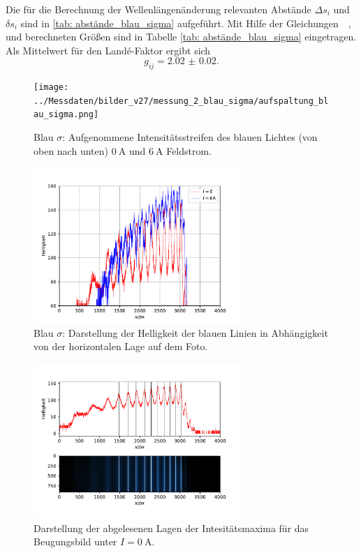 Die für die Berechnung der Wellenlängenänderung relevanten Abstände $\Delta s_i$ und $\delta s_i$
sind in \autoref{tab: abstände_blau_sigma}
aufgeführt. Mit Hilfe der Gleichungen~~\label{eq: wellen_änderung}, \label{eq:energie_diff} und \label{eq: uebergangs_lande}
berechneten Größen sind in Tabelle
\ref{tab: abstände_blau_sigma} eingetragen. Als Mittelwert für den Landé-Faktor ergibt sich
\begin{equation}
  g_{ij} = \num{2.02(2)}.
\end{equation}
\begin{figure}
  \centering
  \texttt{[image: ../Messdaten/bilder\_v27/messung\_2\_blau\_sigma/aufspaltung\_blau\_sigma.png]}
  \caption{Blau $\sigma$: Aufgenommene Intensitätsstreifen des blauen Lichtes (von oben nach unten) $\SI{0}{\ampere}$ und $\SI{6}{\ampere}$ Feldstrom.}
  \label{fig: aufspaltung_blau_sigma}
\end{figure}
\begin{figure}
  \centering
  \includegraphics[width = 0.7\textwidth]{../Messdaten/plots/blau_sigma_intensitaet.pdf}
  \caption{Blau $\sigma$: Darstellung der Helligkeit der blauen Linien in Abhängigkeit von der horizontalen Lage auf dem Foto.}
  \label{fig: blau_intensität_sigma}
\end{figure}

\begin{figure}
  \centering
  \includegraphics[width = 0.7\textwidth]{../Messdaten/plots/peaks_blau_sigma_0.pdf}
  \caption{Darstellung der abgelesenen Lagen der Intesitätsmaxima für das Beugungsbild unter $I =\SI{0}{\ampere}$.}
  \label{fig: peaks_blau_0}
\end{figure}
